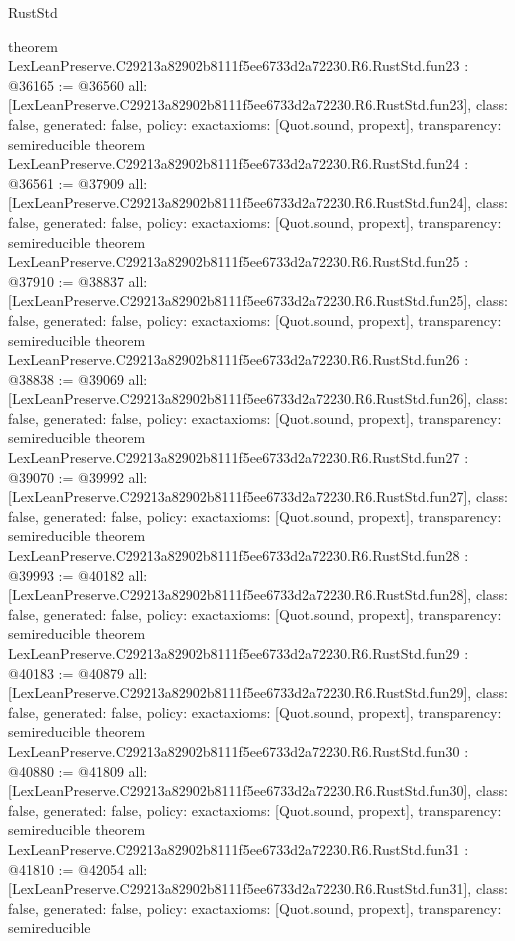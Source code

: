 \begin{lexlean}{RustStd}
\begin{coremodule}
{}
theorem LexLeanPreserve.C29213a82902b8111f5ee6733d2a72230.R6.RustStd.fun23 : @36165 := @36560 {
  all: [LexLeanPreserve.C29213a82902b8111f5ee6733d2a72230.R6.RustStd.fun23],
  class: false,
  generated: false,
  policy: exact{axioms: [Quot.sound, propext]},
  transparency: semireducible
}
theorem LexLeanPreserve.C29213a82902b8111f5ee6733d2a72230.R6.RustStd.fun24 : @36561 := @37909 {
  all: [LexLeanPreserve.C29213a82902b8111f5ee6733d2a72230.R6.RustStd.fun24],
  class: false,
  generated: false,
  policy: exact{axioms: [Quot.sound, propext]},
  transparency: semireducible
}
theorem LexLeanPreserve.C29213a82902b8111f5ee6733d2a72230.R6.RustStd.fun25 : @37910 := @38837 {
  all: [LexLeanPreserve.C29213a82902b8111f5ee6733d2a72230.R6.RustStd.fun25],
  class: false,
  generated: false,
  policy: exact{axioms: [Quot.sound, propext]},
  transparency: semireducible
}
theorem LexLeanPreserve.C29213a82902b8111f5ee6733d2a72230.R6.RustStd.fun26 : @38838 := @39069 {
  all: [LexLeanPreserve.C29213a82902b8111f5ee6733d2a72230.R6.RustStd.fun26],
  class: false,
  generated: false,
  policy: exact{axioms: [Quot.sound, propext]},
  transparency: semireducible
}
theorem LexLeanPreserve.C29213a82902b8111f5ee6733d2a72230.R6.RustStd.fun27 : @39070 := @39992 {
  all: [LexLeanPreserve.C29213a82902b8111f5ee6733d2a72230.R6.RustStd.fun27],
  class: false,
  generated: false,
  policy: exact{axioms: [Quot.sound, propext]},
  transparency: semireducible
}
theorem LexLeanPreserve.C29213a82902b8111f5ee6733d2a72230.R6.RustStd.fun28 : @39993 := @40182 {
  all: [LexLeanPreserve.C29213a82902b8111f5ee6733d2a72230.R6.RustStd.fun28],
  class: false,
  generated: false,
  policy: exact{axioms: [Quot.sound, propext]},
  transparency: semireducible
}
theorem LexLeanPreserve.C29213a82902b8111f5ee6733d2a72230.R6.RustStd.fun29 : @40183 := @40879 {
  all: [LexLeanPreserve.C29213a82902b8111f5ee6733d2a72230.R6.RustStd.fun29],
  class: false,
  generated: false,
  policy: exact{axioms: [Quot.sound, propext]},
  transparency: semireducible
}
theorem LexLeanPreserve.C29213a82902b8111f5ee6733d2a72230.R6.RustStd.fun30 : @40880 := @41809 {
  all: [LexLeanPreserve.C29213a82902b8111f5ee6733d2a72230.R6.RustStd.fun30],
  class: false,
  generated: false,
  policy: exact{axioms: [Quot.sound, propext]},
  transparency: semireducible
}
theorem LexLeanPreserve.C29213a82902b8111f5ee6733d2a72230.R6.RustStd.fun31 : @41810 := @42054 {
  all: [LexLeanPreserve.C29213a82902b8111f5ee6733d2a72230.R6.RustStd.fun31],
  class: false,
  generated: false,
  policy: exact{axioms: [Quot.sound, propext]},
  transparency: semireducible
}
\end{coremodule}
\end{lexlean}
